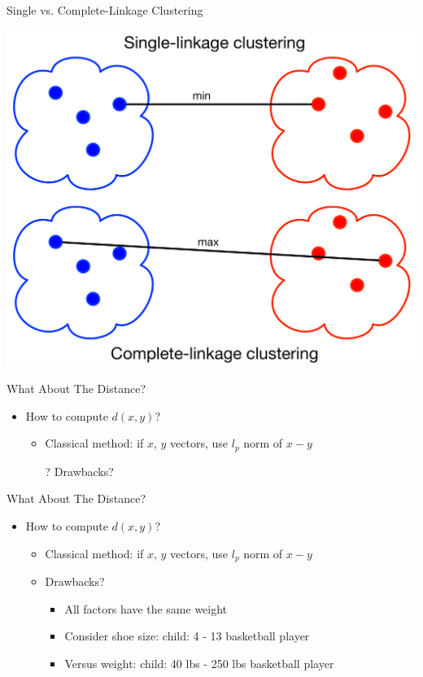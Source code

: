\documentclass[aspectratio=169]{beamer}
\begin{document}
\begin{frame}{Single vs. Complete-Linkage Clustering}

\includegraphics[width=.65\textwidth]{./lectUL/compareLinkageClustering.pdf}
\end{frame}

\begin{frame}{What About The Distance?}

\begin{itemize}
\item How to compute $d(x, y)$?
	\begin{itemize}
	\item Classical method: if $x$, $y$ vectors, use $l_p$ norm of $x - y$
	\item[?] Drawbacks?
	\end{itemize}
\end{itemize}



\end{frame}
\begin{frame}{What About The Distance?}

\begin{itemize}
\item How to compute $d(x, y)$?
	\begin{itemize}
	\item Classical method: if $x$, $y$ vectors, use $l_p$ norm of $x - y$
	\item Drawbacks?
	\begin{itemize}
	\item All factors have the same weight
	\item Consider shoe size: child: 4 - 13 basketball player
	\item Versus weight: child: 40 lbs - 250 lbs basketball player
	\end{itemize}
	\end{itemize}
\end{itemize}
\end{frame}
\end{document}
